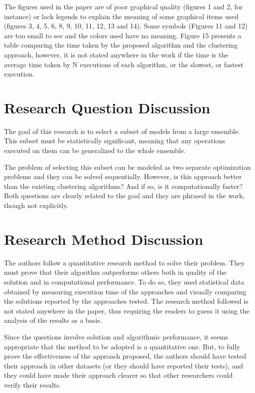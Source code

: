 \documentclass[]{report}
\begin{document}
The figures used in the paper are of poor graphical quality (figures 1 and 2, for instance) or lack legends to explain the meaning of some graphical items used (figures 3, 4, 5, 6, 8, 9, 10, 11, 12, 13 and 14). Some symbols (Figures 11 and 12) are too small to see and the colors used have no meaning. Figure 15 presents a table comparing the time taken by the proposed algorithm and the clustering approach, however, it is not stated anywhere in the work if the time is the average time taken by N executions of each algorithm, or the slowest, or fastest execution.

\section{Research Question Discussion}
The goal of this research is to select a subset of models from a large ensemble. This subset must be statistically significant, meaning that any operations executed on them can be generalized to the whole ensemble.

The problem of selecting this subset can be modeled as two separate optimization problems and they can be solved sequentially. However, is this approach better than the existing clustering algorithms? And if so, is it computationally faster? Both questions are clearly related to the goal and they are phrased in the work, though not explicitly.

\section{Research Method Discussion}
The authors follow a quantitative research method to solve their problem. They must prove that their algorithm outperforms others both in quality of the solution and in computational performance. To do so, they used statistical data obtained by measuring execution time of the approaches and visually comparing the solutions reported by the approaches tested. The research method followed is not stated anywhere in the paper, thus requiring the readers to guess it using the analysis of the results as a basis.

Since the questions involve solution and algorithmic performance, it seems appropriate that the method to be adopted is a quantitative one. But, to fully prove the effectiveness of the approach proposed, the authors should have tested their approach in other datasets (or they should have reported their tests), and they could have made their approach clearer so that other researchers could verify their results.
\end{document}

